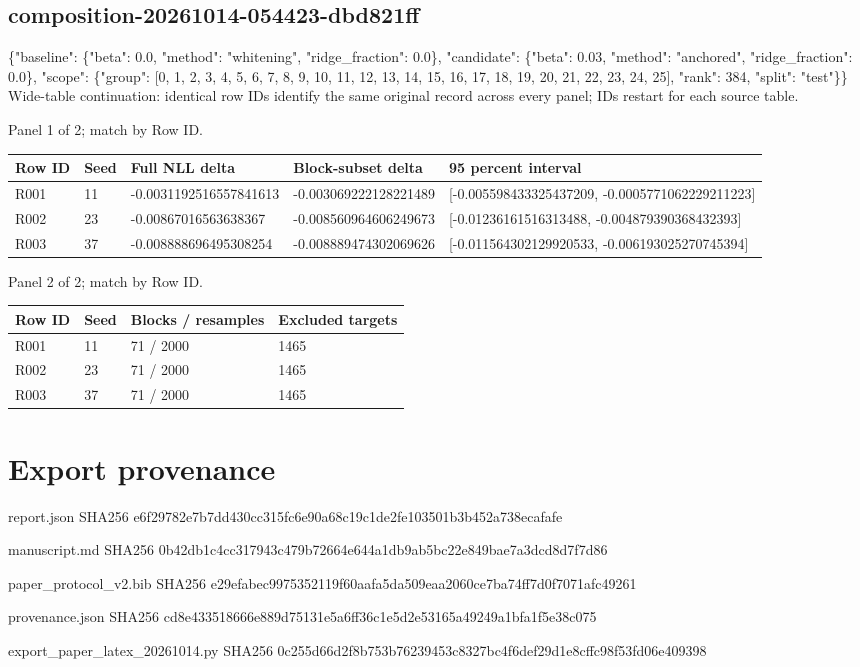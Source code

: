 \documentclass[10pt]{article}
\begin{document}
\subsection{composition-20261014-054423-dbd821ff}
\{"baseline": \{"beta": 0.0, "method": "whitening", "ridge\_fraction": 0.0\}, "candidate": \{"beta": 0.03, "method": "anchored", "ridge\_fraction": 0.0\}, "scope": \{"group": [0, 1, 2, 3, 4, 5, 6, 7, 8, 9, 10, 11, 12, 13, 14, 15, 16, 17, 18, 19, 20, 21, 22, 23, 24, 25], "rank": 384, "split": "test"\}\}
Wide-table continuation: identical row IDs identify the same original record across every panel; IDs restart for each source table.
\par\noindent Panel 1 of 2; match by Row ID.
{\scriptsize\setlength{\tabcolsep}{2pt}
\begin{longtable}{p{}p{}p{}p{}p{}}
Row ID & Seed & Full NLL delta & Block-subset delta & 95 percent interval \\
\hline\endhead
R001 & 11 & -0.0031192516557841613 & -0.003069222128221489 & [-0.005598433325437209, -0.0005771062229211223] \\
R002 & 23 & -0.00867016563638367 & -0.008560964606249673 & [-0.01236161516313488, -0.004879390368432393] \\
R003 & 37 & -0.008888696495308254 & -0.008889474302069626 & [-0.011564302129920533, -0.006193025270745394] \\
\end{longtable}}
\par\noindent Panel 2 of 2; match by Row ID.
{\scriptsize\setlength{\tabcolsep}{2pt}
\begin{longtable}{p{}p{}p{}p{}}
Row ID & Seed & Blocks / resamples & Excluded targets \\
\hline\endhead
R001 & 11 & 71 / 2000 & 1465 \\
R002 & 23 & 71 / 2000 & 1465 \\
R003 & 37 & 71 / 2000 & 1465 \\
\end{longtable}}
\section{Export provenance}
\par\noindent\small report.json SHA256 e6f29782e7b7dd430cc315fc6e90a68c19c1de2fe103501b3b452a738ecafafe
\par\noindent\small manuscript.md SHA256 0b42db1c4cc317943c479b72664e644a1db9ab5bc22e849bae7a3dcd8d7f7d86
\par\noindent\small paper\_protocol\_v2.bib SHA256 e29efabec9975352119f60aafa5da509eaa2060ce7ba74ff7d0f7071afc49261
\par\noindent\small provenance.json SHA256 cd8e433518666e889d75131e5a6ff36c1e5d2e53165a49249a1bfa1f5e38c075
\par\noindent\small export\_paper\_latex\_20261014.py SHA256 0c255d66d2f8b753b76239453c8327bc4f6def29d1e8cffc98f53fd06e409398
\end{document}
